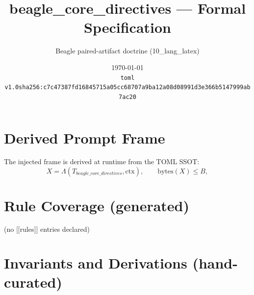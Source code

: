 \documentclass[11pt]{article}
\title{beagle\_core\_directives --- Formal Specification}
\author{Beagle paired-artifact doctrine (10\_lang\_latex)}
\date{\today\\ \texttt{toml v1.0\quad sha256:c7c47387fd16845715a05cc68707a9ba12a08d08991d3e366b5147999ab7ac20}}
\begin{document}
\maketitle

\section{Derived Prompt Frame}
The injected frame is derived at runtime from the TOML SSOT:
\begin{equation}
  X = \Lambda(T_{beagle\_core\_directives}, \mathrm{ctx}), \qquad \mathrm{bytes}(X) \le B,
  \label{lbl:derive-frame}
\end{equation}

\section{Rule Coverage (generated)}
(no [[rules]] entries declared)

\section{Invariants and Derivations (hand-curated)}
\end{document}
